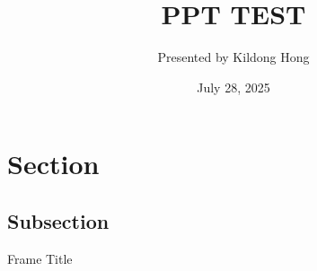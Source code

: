 \documentclass[serif,table,10pt,aspectratio=169]{beamer}
\title[]{\large
PPT TEST
}
\date[August, 2025]{July 28, 2025}
\author[J.~Smith]{Presented by Kildong Hong}
\institute{FCAI Lab \\Yonsei University}
\begin{document}
\frame{\titlepage}

\section{Section}

\subsection{Subsection}

\begin{frame}{Frame Title}

\end{frame}
\end{document}
